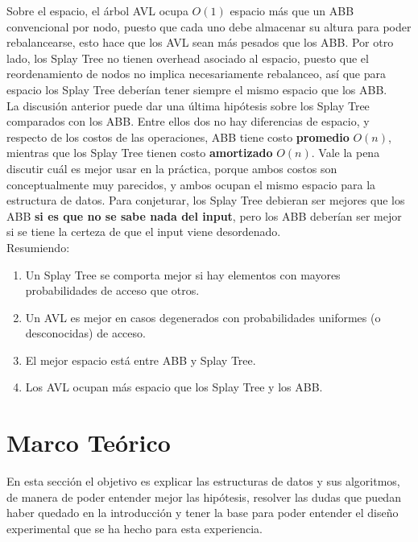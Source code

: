 \documentclass[12pt,letterpaper]{report}
\begin{document}
Sobre el espacio, el árbol AVL ocupa $O(1)$ espacio más que un ABB convencional por nodo, puesto que cada uno debe almacenar su altura para poder rebalancearse, esto hace que los AVL sean más pesados que los ABB. Por otro lado, los Splay Tree no tienen overhead asociado al espacio, puesto que el reordenamiento de nodos no implica necesariamente rebalanceo, así que para espacio los Splay Tree deberían tener siempre el mismo espacio que los ABB.\\

La discusión anterior puede dar una última hipótesis sobre los Splay Tree comparados con los ABB. Entre ellos dos no hay diferencias de espacio, y respecto de los costos de las operaciones, ABB tiene costo \textbf{promedio} $O(n)$, mientras que los Splay Tree tienen costo \textbf{amortizado} $O(n)$. Vale la pena discutir cuál es mejor usar en la práctica, porque ambos costos son conceptualmente muy parecidos, y ambos ocupan el mismo espacio para la estructura de datos. Para conjeturar, los Splay Tree debieran ser mejores que los ABB \textbf{si es que no se sabe nada del input}, pero los ABB deberían ser mejor si se tiene la certeza de que el input viene desordenado.\\

Resumiendo:

\begin{enumerate}
\item Un Splay Tree se comporta mejor si hay elementos con mayores probabilidades de acceso que otros.
\item Un AVL es mejor en casos degenerados con probabilidades uniformes (o desconocidas) de acceso.
\item El mejor espacio está entre ABB y Splay Tree.
\item Los AVL ocupan más espacio que los Splay Tree y los ABB.
\end{enumerate}

\newpage
\section{Marco Teórico}
\label{sec:marco}

En esta sección el objetivo es explicar las estructuras de datos y sus algoritmos, de manera de poder entender mejor las hipótesis, resolver las dudas que puedan haber quedado en la introducción y tener la base para poder entender el diseño experimental que se ha hecho para esta experiencia.\\
\end{document}
